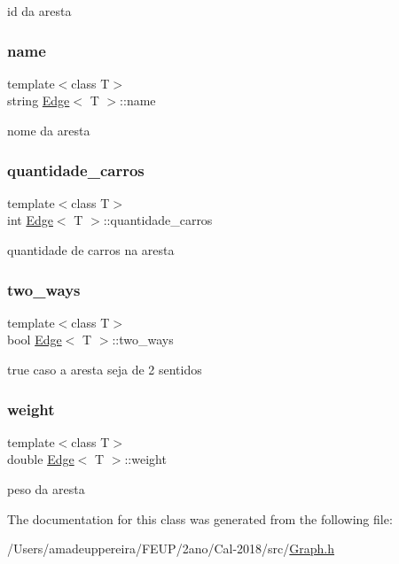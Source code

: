 id da aresta \mbox{\label{class_edge_a68c87e8024711c383a9bbcb2793e4d0c}} 
\subsubsection{\texorpdfstring{name}{name}}
{\footnotesize\ttfamily template$<$class T$>$ \\
string \mbox{\hyperlink{class_edge}{Edge}}$<$ T $>$\+::name\hspace{0.3cm}{\ttfamily [private]}}

nome da aresta \mbox{\label{class_edge_a1b5317f59441ca01b3b09a37d0ee57b5}} 
\subsubsection{\texorpdfstring{quantidade\+\_\+carros}{quantidade\_carros}}
{\footnotesize\ttfamily template$<$class T$>$ \\
int \mbox{\hyperlink{class_edge}{Edge}}$<$ T $>$\+::quantidade\+\_\+carros\hspace{0.3cm}{\ttfamily [private]}}

quantidade de carros na aresta \mbox{\label{class_edge_a555b4858038c4cc6b0e064fb2db5c397}} 
\subsubsection{\texorpdfstring{two\+\_\+ways}{two\_ways}}
{\footnotesize\ttfamily template$<$class T$>$ \\
bool \mbox{\hyperlink{class_edge}{Edge}}$<$ T $>$\+::two\+\_\+ways\hspace{0.3cm}{\ttfamily [private]}}

true caso a aresta seja de 2 sentidos \mbox{\label{class_edge_af188b57b604f0d65e2da48733bd76426}} 
\subsubsection{\texorpdfstring{weight}{weight}}
{\footnotesize\ttfamily template$<$class T$>$ \\
double \mbox{\hyperlink{class_edge}{Edge}}$<$ T $>$\+::weight\hspace{0.3cm}{\ttfamily [private]}}

peso da aresta 

The documentation for this class was generated from the following file\+:\begin{DoxyCompactItemize}
\item 
/\+Users/amadeuppereira/\+F\+E\+U\+P/2ano/\+Cal-\/2018/src/\mbox{\hyperlink{_graph_8h}{Graph.\+h}}\end{DoxyCompactItemize}
